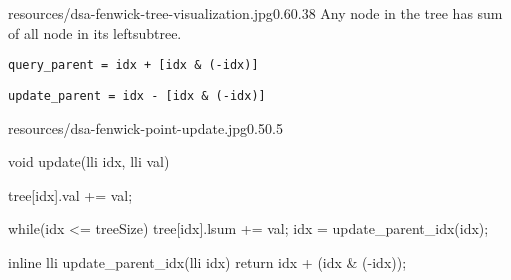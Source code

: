 \begin{lfigure}{resources/dsa-fenwick-tree-visualization.jpg}{0.6}{0.38}
    Any node in the tree has sum of all node in its leftsubtree.
    \vspace{1cm}

    \verb|query_parent = idx + [idx & (-idx)]|

    \verb|update_parent = idx - [idx & (-idx)]|

\end{lfigure}

\begin{lfigure}{resources/dsa-fenwick-point-update.jpg}{0.5}{0.5}

    \begin{code3}
    void update(lli idx, lli val)
    {
        tree[idx].val += val;

        while(idx <= treeSize)
        {
            tree[idx].lsum += val;
            idx = update_parent_idx(idx);
        }
    }

  
    inline lli update_parent_idx(lli idx)
    {
        return  idx + (idx & (-idx));
    }
    \end{code3}

\end{lfigure}